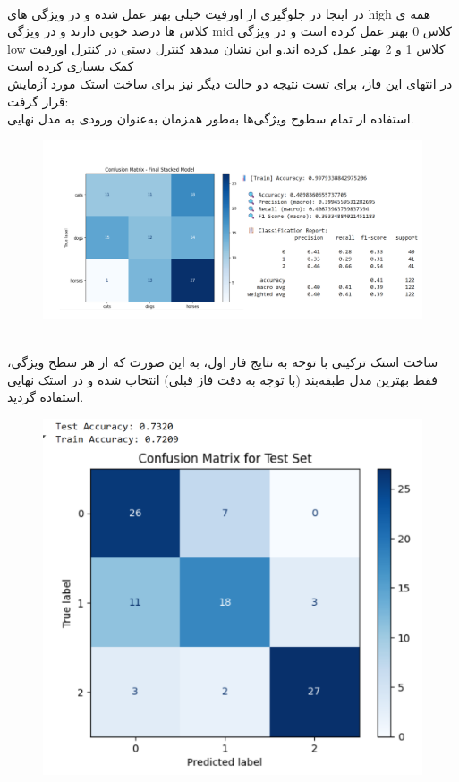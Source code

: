 \documentclass[a4paper,12pt]{article}
\begin{document}
\FloatBarrier
\\
در اینجا در جلوگیری از اورفیت خیلی بهتر عمل شده و در ویژگی های high همه ی کلاس ها درصد خوبی دارند و در ویژگی mid کلاس 0 بهتر عمل کرده است و در ویژگی low کلاس 1 و 2 بهتر عمل کرده اند.و این نشان میدهد کنترل دستی در کنترل اورفیت کمک بسیاری کرده است
\\
در انتهای این فاز، برای تست نتیجه دو حالت دیگر نیز برای ساخت استک مورد آزمایش قرار گرفت:
\\

استفاده از تمام سطوح ویژگی‌ها به‌طور همزمان به‌عنوان ورودی به مدل نهایی.
\\
\begin{figure}[h]
	\centering
	\includegraphics[width=1\textwidth]{all.png}
\end{figure}
\FloatBarrier
\\
ساخت استک ترکیبی با توجه به نتایج فاز اول، به این صورت که از هر سطح ویژگی، فقط بهترین مدل طبقه‌بند (با توجه به دقت فاز قبلی) انتخاب شده و در استک نهایی استفاده گردید.
\\
\begin{figure}[h]
	\centering
	\includegraphics[width=1\textwidth]{tarkib.png}
\end{figure}
\end{document}
